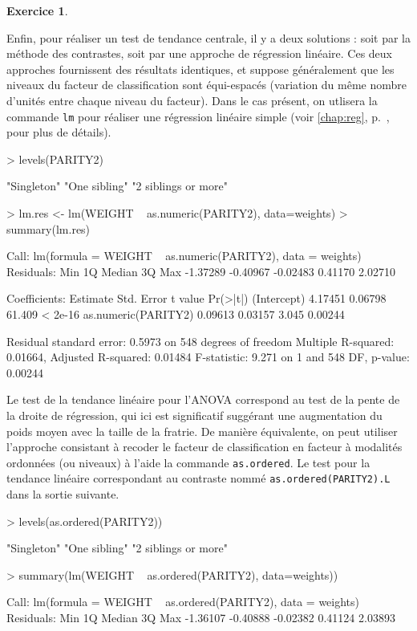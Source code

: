 \documentclass[11pt]{report}
\theoremstyle{definition}
\newtheorem{exo}{Exercice}[chapter]
\begin{document}
\begin{exo}
\begin{sol}
Enfin, pour réaliser un test de tendance centrale, il y a deux solutions :
soit par la méthode des contrastes, soit par une approche de régression
linéaire. Ces deux approches fournissent des résultats identiques, et
suppose généralement que les niveaux du facteur de classification sont
équi-espacés (variation du même nombre d'unités entre chaque niveau du
facteur). Dans le cas présent, on utlisera la commande \texttt{lm} pour
réaliser une régression linéaire simple (voir \ref{chap:reg},
p.~\pageref{chap:reg}, pour plus de détails). 
\begin{Schunk}
\begin{Sinput}
> levels(PARITY2)
\end{Sinput}
\begin{Soutput}
[1] "Singleton"          "One sibling"        "2 siblings or more"
\end{Soutput}
\begin{Sinput}
> lm.res <- lm(WEIGHT ~ as.numeric(PARITY2), data=weights)
> summary(lm.res)
\end{Sinput}
\begin{Soutput}
Call:
lm(formula = WEIGHT ~ as.numeric(PARITY2), data = weights)
Residuals:
     Min       1Q   Median       3Q      Max 
-1.37289 -0.40967 -0.02483  0.41170  2.02710 

Coefficients:
                    Estimate Std. Error t value Pr(>|t|)
(Intercept)          4.17451    0.06798  61.409  < 2e-16
as.numeric(PARITY2)  0.09613    0.03157   3.045  0.00244

Residual standard error: 0.5973 on 548 degrees of freedom
Multiple R-squared: 0.01664,	Adjusted R-squared: 0.01484 
F-statistic: 9.271 on 1 and 548 DF,  p-value: 0.00244 
\end{Soutput}
\end{Schunk}
Le test de la tendance linéaire pour l'ANOVA correspond au test de la pente
de la droite de régression, qui ici est significatif suggérant une
augmentation du poids moyen avec la taille de la fratrie.
De manière équivalente, on peut utiliser l'approche consistant à recoder le
facteur de classification en facteur à modalités ordonnées (ou niveaux) à
l'aide la commande \texttt{as.ordered}. Le test pour la tendance linéaire
correspondant au contraste nommé \texttt{as.ordered(PARITY2).L} dans la
sortie suivante.
\begin{Schunk}
\begin{Sinput}
> levels(as.ordered(PARITY2))
\end{Sinput}
\begin{Soutput}
[1] "Singleton"          "One sibling"        "2 siblings or more"
\end{Soutput}
\begin{Sinput}
> summary(lm(WEIGHT ~ as.ordered(PARITY2), data=weights))
\end{Sinput}
\begin{Soutput}
Call:
lm(formula = WEIGHT ~ as.ordered(PARITY2), data = weights)
Residuals:
     Min       1Q   Median       3Q      Max 
-1.36107 -0.40888 -0.02382  0.41124  2.03893 


\end{Soutput}
\end{Schunk}
\end{sol}
\end{exo}
\end{document}
